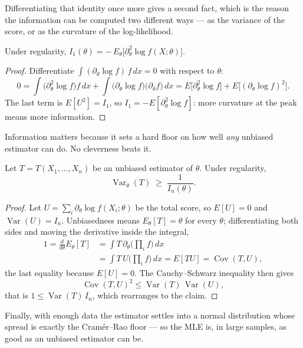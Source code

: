 \documentclass[11pt]{article}
\begin{document}
Differentiating that identity once more gives a second fact, which is the
reason the information can be computed two different ways --- as the
variance of the score, or as the curvature of the log-likelihood.

\begin{theorem}
Under regularity, $I_1(\theta) = -\,E_\theta\!\big[\partial_\theta^2 \log f(X;\theta)\big]$.
\end{theorem}
\begin{proof}
Differentiate $\int (\partial_\theta\log f)\,f\,dx=0$ with respect to
$\theta$:
\[
  0 = \int \big(\partial_\theta^2\log f\big) f\,dx
    + \int \big(\partial_\theta\log f\big)\big(\partial_\theta f\big)\,dx
    = E\!\big[\partial_\theta^2\log f\big] + E\!\big[(\partial_\theta\log f)^2\big].
\]
The last term is $E[U^2]=I_1$, so $I_1 = -E[\partial_\theta^2\log f]$: more
curvature at the peak means more information.
\end{proof}

Information matters because it sets a hard floor on how well \emph{any}
unbiased estimator can do. No cleverness beats it.

\begin{theorem}
Let $T=T(X_1,\dots,X_n)$ be an unbiased estimator of $\theta$. Under
regularity,
\[
  \operatorname{Var}_\theta(T) \;\ge\; \frac{1}{I_n(\theta)}.
\]
\end{theorem}
\begin{proof}
Let $U=\sum_i \partial_\theta\log f(X_i;\theta)$ be the total score, so
$E[U]=0$ and $\operatorname{Var}(U)=I_n$. Unbiasedness means
$E_\theta[T]=\theta$ for every $\theta$; differentiating both sides and
moving the derivative inside the integral,
\begin{align*}
  1 = \frac{d}{d\theta}E_\theta[T]
    &= \int T\,\partial_\theta\!\Big(\prod_i f\Big)\,dx \\
    &= \int T\,U \Big(\prod_i f\Big)\,dx
     = E[TU] = \operatorname{Cov}(T,U),
\end{align*}
the last equality because $E[U]=0$. The Cauchy--Schwarz inequality then
gives
\[
  \operatorname{Cov}(T,U)^2 \le \operatorname{Var}(T)\,\operatorname{Var}(U),
\]
that is $1 \le \operatorname{Var}(T)\,I_n$, which rearranges to the claim.
\end{proof}

Finally, with enough data the estimator settles into a normal distribution
whose spread is exactly the Cram\'er--Rao floor --- so the MLE is, in large
samples, as good as an unbiased estimator can be.
\end{document}
